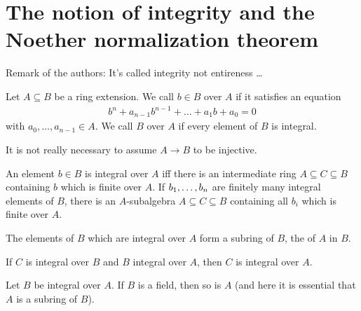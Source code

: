 \documentclass[a4paper,parskip=half,numbers=enddot, DIV=12]{scrreprt}
\begin{document}
	\section{The notion of integrity and the Noether normalization theorem}
	Remark of the authors: It's called integrity not entireness \ldots
	\begin{defi}
		Let $A\subseteq B$ be a ring extension. We call $b\in B$  over $A$ if it satisfies an equation
		\begin{align*}
		b^n +a_{n-1}b^{n-1}+\ldots+a_1b+a_0 =0
		\end{align*}
		with $a_0,\ldots,a_{n-1}\in A$. We call $B$  over $A$ if every element of $B$ is integral.
	\end{defi}
	\begin{rem}
		It is not really necessary to assume $A\to B$ to be injective.
	\end{rem}
	\begin{prop}
		\begin{alphanumerate}
			\item An element $b\in B$ is integral over $A$ iff there is an intermediate ring $A\subseteq C\subseteq B$ containing $b$ which is finite over $A$. If $b_1,\ldots, b_n$ are finitely many integral elements of $B$, there is an $A$-subalgebra $A\subseteq C\subseteq B$ containing all $b_i$ which is finite over $A$.%
			\item The elements of $B$ which are integral over $A$ form a subring of $B$, the  of $A$ in $B$.
			\item If $C$ is integral over $B$ and $B$ integral over $A$, then $C$ is integral over $A$.
			\item Let $B$ be integral over $A$. If $B$ is a field, then so is $A$ (and here it is essential that $A$ is a subring of $B$).
		\end{alphanumerate}
		
	\end{prop}
	
\end{document}
